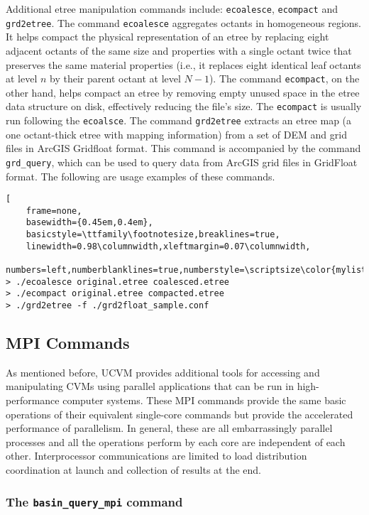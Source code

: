 Additional etree manipulation commands include: \texttt{ecoalesce}, \texttt{ecompact} and \texttt{grd2etree}. The command \texttt{ecoalesce} aggregates octants in homogeneous regions. It helps compact the physical representation of an etree by replacing eight adjacent octants of the same size and properties with a single octant twice that preserves the same material properties (i.e., it replaces eight identical leaf octants at level $n$ by their parent octant at level $N-1$). The command \texttt{ecompact}, on the other hand, helps compact an etree by removing empty unused space in the etree data structure on disk, effectively reducing the file's size. The \texttt{ecompact} is usually run following the \texttt{ecoalsce}. The command \texttt{grd2etree} extracts an etree map (a one octant-thick etree with mapping information) from a set of DEM and \vsthirty{} grid files in ArcGIS Gridfloat format. This command is accompanied by the command \texttt{grd\_query}, which can be used to query data from ArcGIS grid files in GridFloat format. The following are usage examples of these commands.

\begin{lstlisting}[
	frame=none,
	basewidth={0.45em,0.4em},
	basicstyle=\ttfamily\footnotesize,breaklines=true,
	linewidth=0.98\columnwidth,xleftmargin=0.07\columnwidth,
	numbers=left,numberblanklines=true,numberstyle=\scriptsize\color{mylistingnclr}]
> ./ecoalesce original.etree coalesced.etree
> ./ecompact original.etree compacted.etree
> ./grd2etree -f ./grd2float_sample.conf
\end{lstlisting}

\subsection{MPI Commands}

As mentioned before, UCVM provides additional tools for accessing and manipulating CVMs using parallel applications that can be run in high-performance computer systems. These MPI commands provide the same basic operations of their equivalent single-core commands but provide the accelerated performance of parallelism. In general, these are all embarrassingly parallel processes and all the operations perform by each core are independent of each other. Interprocessor communications are limited to load distribution coordination at launch and collection of results at the end.

\subsubsection{The \textup{\texttt{basin\_query\_mpi}} command}

